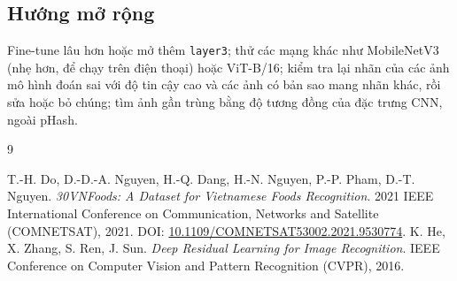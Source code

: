 \subsection*{Hướng mở rộng}
Fine-tune lâu hơn hoặc mở thêm \texttt{layer3}; thử các mạng khác như MobileNetV3 (nhẹ hơn, để chạy trên điện thoại) hoặc
ViT-B/16; kiểm tra lại nhãn của các ảnh mô hình đoán sai với độ tin cậy cao và các ảnh có bản sao mang nhãn khác, rồi
sửa hoặc bỏ chúng; tìm ảnh gần trùng bằng độ tương đồng
của đặc trưng CNN, ngoài pHash.

\begin{thebibliography}{9}
\raggedright
{} T.-H. Do, D.-D.-A. Nguyen, H.-Q. Dang, H.-N. Nguyen, P.-P. Pham, D.-T. Nguyen.
  \textit{30VNFoods: A Dataset for Vietnamese Foods Recognition}. 2021 IEEE International Conference on Communication,
  Networks and Satellite (COMNETSAT), 2021. DOI: \url{10.1109/COMNETSAT53002.2021.9530774}.
 K. He, X. Zhang, S. Ren, J. Sun. \textit{Deep Residual Learning for Image Recognition}. IEEE
  Conference on Computer Vision and Pattern Recognition (CVPR), 2016.
\end{thebibliography}
